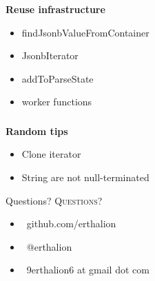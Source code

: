 \documentclass[usenames,dvipsnames, 18pt, compress, aspectratio=169]{beamer}
\def\twitter{{\FA \faTwitter}}
\def\github{{\FA \faGithub}}
\def\email{{\FA \faEnvelope}}
\begin{document}
\begin{frame}
    \frametitle{}
    \begin{center}
        \textbf{Reuse infrastructure}

        \begin{itemize}[label={\MVRightarrow}]
            \item findJsonbValueFromContainer
            \item JsonbIterator
            \item addToParseState
            \item worker functions
        \end{itemize}

    \end{center}
\end{frame}

\begin{frame}
    \frametitle{}
    \begin{center}
        \textbf{Random tips}

        \begin{itemize}[label={\MVRightarrow}]
            \item Clone iterator
            \item String are not null-terminated
        \end{itemize}

    \end{center}
\end{frame}

\fontsize{17pt}{18}\selectfont
\begin{frame}
  \vspace*{2.5cm}
  \begin{minipage}[b][\paperheight]{\textwidth}
  \begin{center}

      \linespread{1.0}%
      \if@noSmallCapitals%
        Questions?
      \else%
        \scshape{\color{black} Questions?}%
      \fi%
      \vspace*{0.3em}

      \fontsize{13pt}{14}\selectfont
        \begin{itemize}[label={}]
            \item {\color{black} \github\ github.com/erthalion}
            \item {\color{black} \twitter\ @erthalion}
            \item {\color{black}\email\ 9erthalion6 at gmail dot com}
        \end{itemize}
      \vspace*{2.5em}%

    \vfill
    \vspace*{2em}
  \end{center}
  \end{minipage}

\end{frame}
\end{document}
